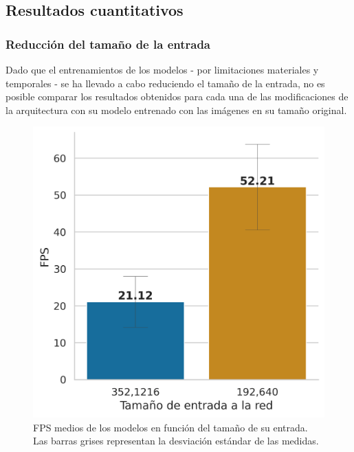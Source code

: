 \subsection{Resultados cuantitativos}

\subsubsection{Reducción del tamaño de la entrada}

Dado que el entrenamientos de los modelos - por limitaciones materiales y temporales - se ha llevado a cabo reduciendo el tamaño de la entrada, no es posible comparar los resultados obtenidos para cada una de las modificaciones de la arquitectura con su modelo entrenado con las imágenes en su tamaño original.

\begin{figure}
\vspace{-15pt}
\includegraphics[width=0.95\linewidth]{imagenes/Resultados/velocidad_inferencia_entrada.png} 
\caption{FPS medios de los modelos en función del tamaño de su entrada. Las barras grises representan la desviación estándar de las medidas.}
\label{fig:resultados-inf-tam-entrada}
\end{figure}

